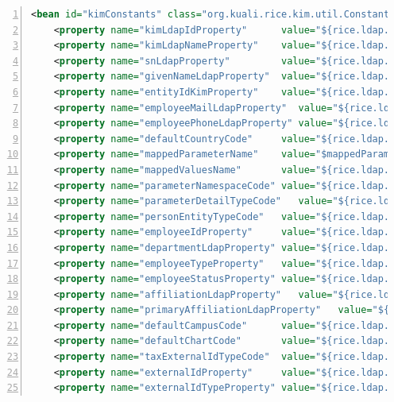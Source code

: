 \begin{enumerate}
\begin{lstlisting}[numbers=left,language=xml,basicstyle=\scriptsize,backgroundcolor=\color{ubergray},caption={trnapp/src/main/resources/KIMLdapSpringBeans.xml},frame=single,breaklines=true]
	<bean id="kimConstants" class="org.kuali.rice.kim.util.ConstantsImpl">
  	<property name="kimLdapIdProperty"     	value="${rice.ldap.param.kimLdapIdProperty}" />
  	<property name="kimLdapNameProperty"   	value="${rice.ldap.param.kimLdapNameProperty}" />
  	<property name="snLdapProperty"        	value="${rice.ldap.param.snLdapProperty}" />
  	<property name="givenNameLdapProperty" 	value="${rice.ldap.param.givenNameLdapProperty}" />
  	<property name="entityIdKimProperty"   	value="${rice.ldap.param.entityIdKimProperty}" />
  	<property name="employeeMailLdapProperty"  value="${rice.ldap.param.employeeMailLdapProperty}" />
  	<property name="employeePhoneLdapProperty" value="${rice.ldap.param.employeePhoneLdapProperty}" />
  	<property name="defaultCountryCode"    	value="${rice.ldap.param.defaultCountryCode}" />
  	<property name="mappedParameterName"   	value="$mappedParameterName}" />
  	<property name="mappedValuesName"      	value="${rice.ldap.param.mappedValuesName}" />
  	<property name="parameterNamespaceCode"	value="${rice.ldap.param.parameterNamespaceCode}" />
  	<property name="parameterDetailTypeCode"   value="${rice.ldap.param.parameterDetailTypeCode}" />
  	<property name="personEntityTypeCode"  	value="${rice.ldap.param.personEntityTypeCode}" />
  	<property name="employeeIdProperty"    	value="${rice.ldap.param.employeeIdPropertyd}" />
  	<property name="departmentLdapProperty"	value="${rice.ldap.param.departmentNumber}" />  
  	<property name="employeeTypeProperty"  	value="${rice.ldap.param.employeeTypeProperty}" />
  	<property name="employeeStatusProperty"	value="${rice.ldap.param.employeeStatusProperty}" />
  	<property name="affiliationLdapProperty"   value="${rice.ldap.param.affiliationLdapProperty}" />
  	<property name="primaryAffiliationLdapProperty"   value="${rice.ldap.param.primaryAffiliationLdapProperty}" />
  	<property name="defaultCampusCode"     	value="${rice.ldap.param.defaultCampusCode}" />
  	<property name="defaultChartCode"      	value="${rice.ldap.param.defaultChartCode}" />
  	<property name="taxExternalIdTypeCode" 	value="${rice.ldap.param.taxExternalIdTypeCode}" />
  	<property name="externalIdProperty"    	value="${rice.ldap.param.externalIdProperty.externalId}" />
  	<property name="externalIdTypeProperty"	value="${rice.ldap.param.externalIdTypeProperty.externalIdentifierTypeCode}" />

\end{lstlisting}
\end{enumerate}
